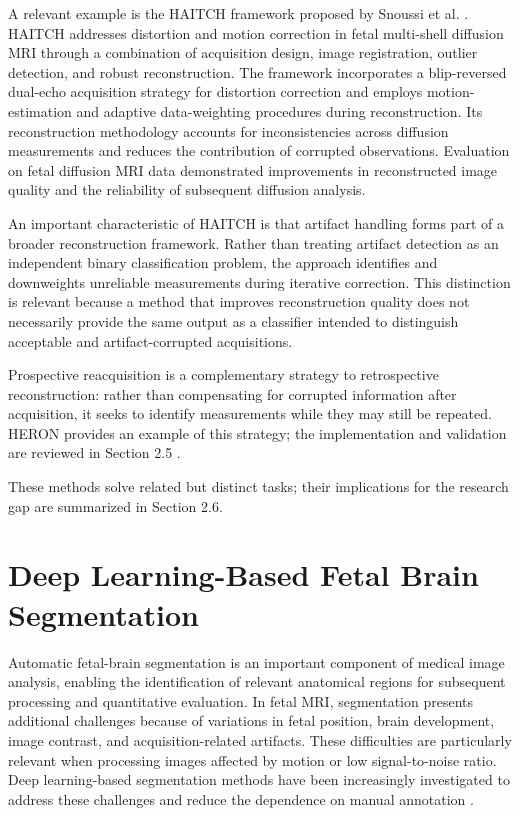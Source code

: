 A relevant example is the HAITCH framework proposed by Snoussi et al. \autocite{snoussi2025haitch}. HAITCH addresses distortion and motion correction in fetal multi-shell diffusion MRI through a combination of acquisition design, image registration, outlier detection, and robust reconstruction. The framework incorporates a blip-reversed dual-echo acquisition strategy for distortion correction and employs motion-estimation and adaptive data-weighting procedures during reconstruction. Its reconstruction methodology accounts for inconsistencies across diffusion measurements and reduces the contribution of corrupted observations. Evaluation on fetal diffusion MRI data demonstrated improvements in reconstructed image quality and the reliability of subsequent diffusion analysis.

An important characteristic of HAITCH is that artifact handling forms part of a broader reconstruction framework. Rather than treating artifact detection as an independent binary classification problem, the approach identifies and downweights unreliable measurements during iterative correction. This distinction is relevant because a method that improves reconstruction quality does not necessarily provide the same output as a classifier intended to distinguish acceptable and artifact-corrupted acquisitions.

Prospective reacquisition is a complementary strategy to retrospective reconstruction: rather than compensating for corrupted information after acquisition, it seeks to identify measurements while they may still be repeated. HERON provides an example of this strategy; the implementation and validation are reviewed in Section 2.5 \autocite{avilesverdera2025heron}.

These methods solve related but distinct tasks; their implications for the research gap are summarized in Section 2.6.

\section{Deep Learning-Based Fetal Brain Segmentation}

Automatic fetal-brain segmentation is an important component of medical image analysis, enabling the identification of relevant anatomical regions for subsequent processing and quantitative evaluation. In fetal MRI, segmentation presents additional challenges because of variations in fetal position, brain development, image contrast, and acquisition-related artifacts. These difficulties are particularly relevant when processing images affected by motion or low signal-to-noise ratio. Deep learning-based segmentation methods have been increasingly investigated to address these challenges and reduce the dependence on manual annotation \autocite{payette2023feta,payette2025feta}.

